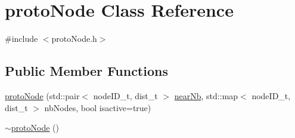 \hypertarget{classprotoNode}{\section{proto\-Node \-Class \-Reference}
\label{classprotoNode}
}


{\ttfamily \#include $<$proto\-Node.\-h$>$}

\subsection*{\-Public \-Member \-Functions}
\begin{DoxyCompactItemize}
\item 
\hyperlink{classprotoNode_aa4b68057501d1778281990132ac91ef6}{proto\-Node} (std\-::pair$<$ node\-I\-D\-\_\-t, dist\-\_\-t $>$ \hyperlink{classprotoNode_a2520a90a64d192423f146e1499874f35}{near\-Nb}, std\-::map$<$ node\-I\-D\-\_\-t, dist\-\_\-t $>$ nb\-Nodes, bool isactive=true)
\item 
\hypertarget{classprotoNode_a4341b741f3b1ac85d21e556e797544fe}{\hyperlink{classprotoNode_a4341b741f3b1ac85d21e556e797544fe}{$\sim$proto\-Node} ()}\label{classprotoNode_a4341b741f3b1ac85d21e556e797544fe}


\end{DoxyCompactItemize}
